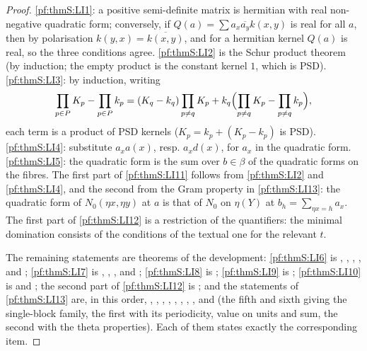 \begin{proof}
\ref{pf:thmS:LI1}: a positive semi-definite matrix is hermitian with real non-negative quadratic form; conversely, if
$Q(a)=\sum a_x\overline{a_y}k(x,y)$ is real for all $a$, then by polarisation $k(y,x)=\overline{k(x,y)}$, and for a hermitian
kernel $Q(a)$ is real, so the three conditions agree. \ref{pf:thmS:LI2} is the Schur product theorem \cite[Thm.~7.5.3]{HornJohnson2013}
(by induction; the empty product is the constant kernel $1$, which is PSD). \ref{pf:thmS:LI3}: by induction, writing
\[
\prod_{p\in P}K_p-\prod_{p\in P}k_p=(K_q-k_q)\prod_{p\ne q}K_p+k_q\Bigl(\prod_{p\ne q}K_p-\prod_{p\ne q}k_p\Bigr),
\]
each term is a product of PSD kernels ($K_p=k_p+(K_p-k_p)$ is PSD). \ref{pf:thmS:LI4}: substitute $a_xa(x)$, resp. $a_xd(x)$, for
$a_x$ in the quadratic form. \ref{pf:thmS:LI5}: the quadratic form is the sum over $b\in\beta$ of the quadratic forms on the fibres.
The first part of \ref{pf:thmS:LI11} follows from \ref{pf:thmS:LI2} and \ref{pf:thmS:LI4}, and the second from the Gram property
in \ref{pf:thmS:LI13}: the quadratic form of $N_0(\eta x,\eta y)$ at $a$ is that of $N_0$ on $\eta(Y)$ at
$b_h=\sum_{\eta x=h}a_x$. The first part of \ref{pf:thmS:LI12} is a restriction of the quantifiers: the minimal domination
consists of the conditions of the textual one for the relevant $t$.

The remaining statements are theorems of the development: \ref{pf:thmS:LI6} is
, , , , and ;
\ref{pf:thmS:LI7} is
, , , and ;
\ref{pf:thmS:LI8} is ; \ref{pf:thmS:LI9} is
; \ref{pf:thmS:LI10} is
 and ; the
second part of \ref{pf:thmS:LI12} is ; and the statements of
\ref{pf:thmS:LI13} are, in this order,
, , , , , , , , and 
(the fifth and sixth giving the single-block family, the first with its periodicity, value on units and sum, the second with the
theta properties). Each of them states exactly the corresponding item.
\end{proof}


